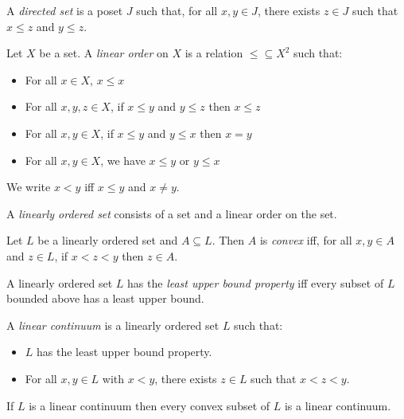   \begin{df}
  A \emph{directed set} is a poset $J$ such that, for all $x, y \in J$, there
exists $z \in J$ such that $x \leq z$ and $y \leq z$.
\end{df}

\begin{df}
  Let $X$ be a set. A \emph{linear order} on $X$ is a relation $\leq
  \subseteq X^2$ such that:
  \begin{itemize}
    \item For all $x \in X$, $x \leq x$
    \item For all $x, y, z \in X$, if $x \leq y$ and $y \leq z$ then $x \leq
    z$
    \item For all $x, y \in X$, if $x \leq y$ and $y \leq x$ then $x = y$
    \item For all $x, y \in X$, we have $x \leq y$ or $y \leq x$
  \end{itemize}
  We write $x < y$ iff $x \leq y$ and $x \neq y$.

  A \emph{linearly ordered set} consists of a set and a linear order on the
  set.
\end{df}

\begin{df}[Convex]
  Let $L$ be a linearly ordered set and $A \subseteq L$. Then $A$ is
  \emph{convex} iff, for all $x, y \in A$ and $z \in L$, if $x < z < y$ then
  $z \in A$.
\end{df}

\begin{df}
  A linearly ordered set $L$ has the \emph{least upper bound property} iff
  every subset of $L$ bounded above has a least upper bound.
\end{df}

\begin{df}
  A \emph{linear continuum} is a linearly ordered set $L$ such that:
  \begin{itemize}
    \item $L$ has the least upper bound property.
    \item For all $x, y \in L$ with $x < y$, there exists $z \in L$ such that
    $x < z < y$.
  \end{itemize}
\end{df}

\begin{prop}
  If $L$ is a linear continuum then every convex subset of $L$ is a linear
  continuum.
\end{prop}

